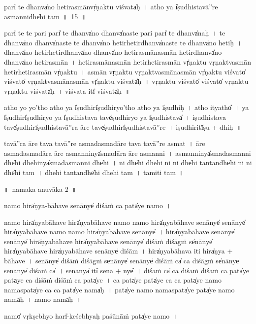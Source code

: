 \documentclass[parskip, DIV=14]{scrartcl}
\begin{document}
{\vspace{0.5cm}
pari̍ te॒ dhanva̍no he॒tira॒smānvṛ̍ṇaktu vi॒śvata̍ḥ~।
atho॒ ya i̍ṣu॒dhistavā॒''re a॒smannidhe̍hi॒ tam~॥~15~॥

pari̍ te te॒ pari॒ pari̍ te॒ dhanva̍no॒ dhanva̍naste॒ pari॒ pari̍ te॒ dhanva̍naḥ~।
te॒ dhanva̍no॒ dhanva̍naste te॒ dhanva̍no he॒tirhe॒tirdhanva̍naste te॒ dhanva̍no he॒tiḥ~।
dhanva̍no he॒tirhe॒tirdhanva̍no॒ dhanva̍no he॒tira॒smāna॒smān he॒tirdhanva̍no॒ dhanva̍no he॒tira॒smān~।
he॒tira॒smāna॒smān he॒tirhe॒tira॒smān vṛ̍ṇaktu vṛṇaktva॒smān he॒tirhe॒tira॒smān vṛ̍ṇaktu~।
a॒smān vṛ̍ṇaktu vṛṇaktva॒smāna॒smān vṛ̍ṇaktu vi॒śvato̍ vi॒śvato̍ vṛṇaktva॒smāna॒smān vṛ̍ṇaktu vi॒śvata̍ḥ~।
vṛ॒ṇa॒ktu॒ vi॒śvato̍ vi॒śvato̍ vṛṇaktu vṛṇaktu vi॒śvata̍ḥ~।
vi॒śvata॒ iti̍  vi॒śvata̍ḥ~॥ 

atho॒ yo yo'tho॒ atho॒ ya i̍ṣu॒dhiri̍ṣu॒dhiryo'tho॒ atho॒ ya i̍ṣu॒dhiḥ~।
atho॒ ityatho̎~।
ya i̍ṣu॒dhiri̍ṣu॒dhiryo ya i̍ṣu॒dhistava॒ tave̍ṣu॒dhiryo ya i̍ṣu॒dhistava̍~।
i॒ṣu॒dhistava॒ tave̍ṣu॒dhiri̍ṣu॒dhistavā॒''ra ā॒re tave̍ṣu॒dhiri̍ṣu॒dhistavā॒''re~।
i॒ṣu॒dhiritī̍ṣu + dhiḥ~॥

tavā॒''ra ā॒re tava॒ tavā॒''re a॒smada॒smadā॒re tava॒ tavā॒''re a॒smat~।
ā॒re a॒smada॒smadā॒ra ā॒re a॒smanninya̍smadā॒ra ā॒re a॒smanni~।
a॒smanninya̍smada॒smanni dhe̍hi dhehi॒nya̍smada॒smanni dhe̍hi~।
ni dhe̍hi dhehi॒ ni ni dhe̍hi॒ tantandhe̍hi॒ ni ni dhe̍hi॒ tam~।
dhe॒hi॒ tantandhe̍hi dhehi॒ tam~।
tamiti॒ tam~॥ 

\newpage
\LARGE
॥~namaka anuvāka 2~॥ 
\Large

\vspace{0.5cm}
namo॒ hira̍ṇya-bāhave senā॒nye̍ di॒śāṁ ca॒ pata̍ye॒ namo॒~।

namo॒ hira̍ṇyabāhave॒ hira̍ṇyabāhave॒ namo॒ namo॒ hira̍ṇyabāhave senā॒nye̍ senā॒nye̍ hira̍ṇyabāhave॒ namo॒ namo॒ hira̍ṇyabāhave senā॒nye̎~।
hira̍ṇyabāhave senā॒nye̍ senā॒nye̍ hira̍ṇyabāhave॒ hira̍ṇyabāhave senā॒nye̍ di॒śāṁ di॒śāgṁ se̍nā॒nye̍ hira̍ṇyabāhave॒ hira̍ṇyabāhave senā॒nye̍ di॒śām~।
hira̍ṇyabāhava॒ iti॒ hira̍ṇya + bā॒ha॒ve॒~।
se॒nā॒nye̍ di॒śāṁ di॒śāgṁ se̍nā॒nye̍ senā॒nye̍ di॒śāṁ ca̍ ca di॒śāgṁ se̍nā॒nye̍ senā॒nye̍ di॒śāṁ ca̍~।
se॒nā॒nya̍ iti̍ senā + nye̎~।
di॒śāṁ ca̍ ca di॒śāṁ di॒śāṁ ca॒ pata̍ye॒ pata̍ye ca di॒śāṁ di॒śāṁ ca॒ pata̍ye~।   
ca॒ pata̍ye॒ pata̍ye ca ca॒ pata̍ye॒ namo॒ nama॒spata̍ye ca ca॒ pata̍ye॒ nama̍ḥ~।
pata̍ye॒ namo॒ nama॒spata̍ye॒ pata̍ye॒ namo॒ nama̍ḥ~।
namo॒ nama̍ḥ~॥ 

\vspace{0.5cm}
namo̍ vṛ॒kṣebhyo॒ hari̍-keśebhyaḥ paśū॒nāṁ pata̍ye॒ namo॒~।

}
\end{document}
